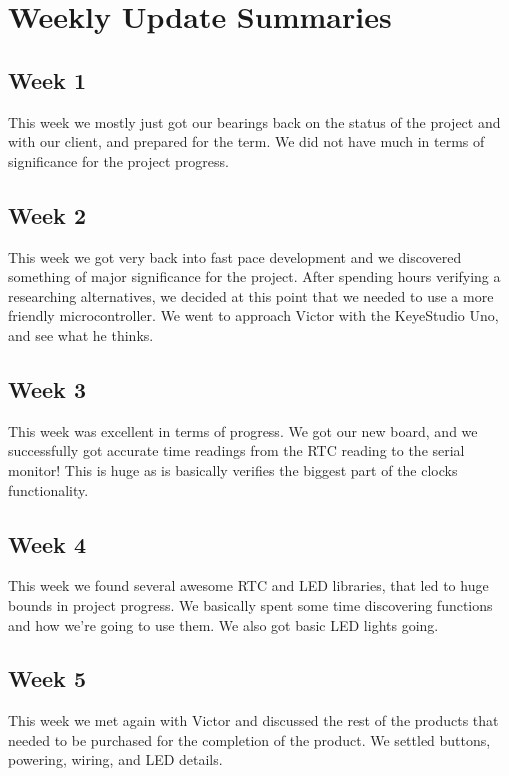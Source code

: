 \documentclass[onecolumn, draftclsnofoot,10pt, compsoc]{IEEEtran}
\begin{document}
\section{Weekly Update Summaries}
\subsection{Week 1}
This week we mostly just got our bearings back on the status of the project and with our client, and prepared for the term.
We did not have much in terms of significance for the project progress.

\subsection{Week 2}
This week we got very back into fast pace development and we discovered something of major significance for the project.
After spending hours verifying a researching alternatives, we decided at this point that we needed to use a more friendly microcontroller.
We went to approach Victor with the KeyeStudio Uno, and see what he thinks.

\subsection{Week 3}
This week was excellent in terms of progress.
We got our new board, and we successfully got accurate time readings from the RTC reading to the serial monitor!
This is huge as is basically verifies the biggest part of the clocks functionality.

\subsection{Week 4}
This week we found several awesome RTC and LED libraries, that led to huge bounds in project progress.
We basically spent some time discovering functions and how we're going to use them.
We also got basic LED lights going.

\subsection{Week 5}
This week we met again with Victor and discussed the rest of the products that needed to be purchased for the completion of the product.
We settled buttons, powering, wiring, and LED details.

\newpage
\end{document}
